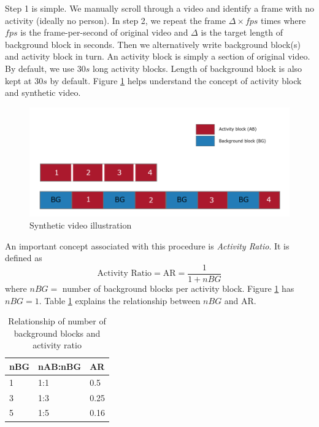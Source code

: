 Step 1 is simple. We manually scroll through a video and identify a frame with no activity (ideally no person). In step 2, we repeat the frame $\Delta \times fps$ times where $fps$ is the frame-per-second of original video and $\Delta$ is the target length of background block in seconds. Then we alternatively write background block(s) and activity block in turn. An activity block is simply a section of original video. By default, we use $30s$ long activity blocks. Length of background block is also kept at $30s$ by default. Figure \ref{fig:synthetic-video} helps understand the concept of activity block and synthetic video.  

\begin{figure}
    \centering
    \includegraphics[width=\linewidth]{images/synthetic-video.PNG}
    \caption{Synthetic video illustration}
    \label{fig:synthetic-video}
\end{figure}

An important concept associated with this procedure is \textit{Activity Ratio}. It is defined as 
$$ \text{Activity Ratio} = \text{AR} = \frac{1}{1+nBG} $$
where $nBG=$ number of background blocks per activity block. Figure \ref{fig:synthetic-video} has $nBG=1$. Table \ref{table:activity-ratio} explains the relationship between $nBG$ and AR. 


\begin{table}
\centering
\caption{Relationship of number of background blocks and activity ratio} \vspace{5pt}
\label{table:activity-ratio}
\begin{tabular}{@{}| l | l | l | @{}} \hline
nBG & nAB:nBG & AR   \\ \hline \hline
1   & 1:1     & 0.5  \\
3   & 1:3     & 0.25 \\
5   & 1:5     & 0.16 \\ \hline
\end{tabular}
\end{table}

